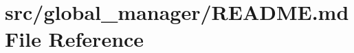 \hypertarget{src_2global__manager_2README_8md}{}\section{src/global\+\_\+manager/\+R\+E\+A\+D\+ME.md File Reference}
\label{src_2global__manager_2README_8md}
